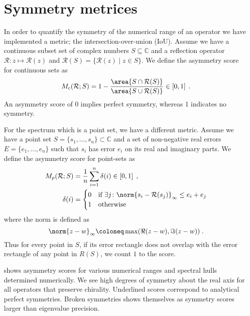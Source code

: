 \chapter{Symmetry metrices}
\label{ch:appendix:symmetries}
\label{ch:appendix:D}


In order to quantify the symmetry of the numerical range of an operator we have implemented a metric; the intersection-over-union (IoU).
Assume we have a continuous subset set of complex numbers $S \subseteq \mathbb{C}$ and a reflection operator $\mathcal{R} \colon z \mapsto \mathcal{R}(z)$ and $\mathcal{R}(S) = \{ \mathcal{R}(z) \mid z \in S \} $.
We define the asymmetry score for continuous sets as
\begin{equation} \label{eq:asymmetry:score:cont}
M_c(\mathcal{R}; S)
= 1-
\frac{\area{ S \cap \mathcal{R}(S) }}
     {\area{ S \cup \mathcal{R}(S) }}
\in \left[ 0, 1 \right] \;.
\end{equation}
An asymmetry score of \num{0} implies perfect symmetry, whereas \num{1} indicates no symmetry.

For the spectrum which is a point set, we have a different metric.
Assume we have a point set $S = \{s_1, \ldots, s_n\} \subset \mathbb{C}$ and a set of non-negative real errors $E = \{e_1, \ldots, e_n\}$ such that $s_i$ has error $e_i$ on its real and imaginary parts.
We define the asymmetry score for point-sets as
\begin{align} \label{eq:asymmetry:score:pt}
M_p(\mathcal{R}; S) &= \frac{1}{n} \sum_{i=1}^{n} \delta(i)
\in \left[ 0, 1 \right] \;, \\
\delta(i) &=
\begin{cases}
    0 & \text{if } \exists j \colon \norm{s_i - \mathcal{R}(s_j)}_{\infty} \leq e_i+e_j \\
    1 & \text{otherwise}
\end{cases}
\end{align}
where the norm is defined as
\begin{equation}
\norm{z - w}_{\infty} \coloneq \max(\Re(z - w), \Im(z - w)) \;.
\end{equation}
Thus for every point in $S$, if its error rectangle does not overlap with the error rectangle of any point in $R(S)$, we count $1$ to the score.

 shows asymmetry scores for various numerical ranges and spectral hulls determined numerically.
We see high degrees of symmetry about the real axis for all operators that preserve chirality.
Underlined scores correspond to analytical perfect symmetries.
Broken symmetries shows themselves as symmetry scores larger than eigenvalue precision.


